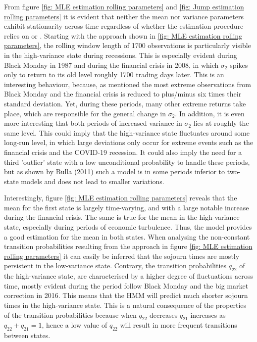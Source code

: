 From figure \ref{fig: MLE estimation rolling parameters} and \ref{fig: Jump estimation rolling parameters} it is evident that neither the mean nor variance parameters exhibit stationarity across time regardless of whether the estimation procedure relies on \mle or \jump. Starting with the \mle approach shown in \cref{fig: MLE estimation rolling parameters}, the rolling window length of 1700 observations is particularly visible in the high-variance state during recessions. This is especially evident during Black Monday in 1987 and during the financial crisis in 2008, in which $\sigma_2$ spikes only to return to its old level roughly 1700 trading days later. This is an interesting behaviour, because, as mentioned the most extreme observations from Black Monday and the financial crisis is reduced to plus/minus six times their standard deviation. Yet, during these periods, many other extreme returns take place, which are responsible for the general change in $\sigma_2$. In addition, it is even more interesting that both periods of increased variance in $\sigma_2$ lies at roughly the same level. This could imply that the high-variance state fluctuates around some long-run level, in which large deviations only occur for extreme events such as the financial crisis and the COVID-19 recession. It could also imply the need for a third 'outlier' state with a low unconditional probability to handle these periods, but as shown by Bulla (2011) such a model is in some periods inferior to two-state models and does not lead to smaller variations.

Interestingly, figure \ref{fig: MLE estimation rolling parameters} reveals that the mean for the first state is largely time-varying, and with a large notable increase during the financial crisis. The same is true for the mean in the high-variance state, especially during periods of economic turbulence. Thus, the model provides a good estimation for the mean in both states. When analysing the non-constant transition probabilities resulting from the \mle approach in figure \ref{fig: MLE estimation rolling parameters} it can easily be inferred that the sojourn times are mostly persistent in the low-variance state. Contrary, the transition probabilities $q_{22}$ of the high-variance state, are characterised by a higher degree of fluctuations across time, mostly evident during the period follow Black Monday and the big market correction in 2016. This means that the HMM will predict much shorter sojourn times in the high-variance state. This is a natural consequence of the properties of the transition probabilities because when $q_{22}$ decreases $q_{21}$ increases as $q_{22} + q_{21} = 1$, hence a low value of $q_{22}$ will result in more frequent transitions between states.


